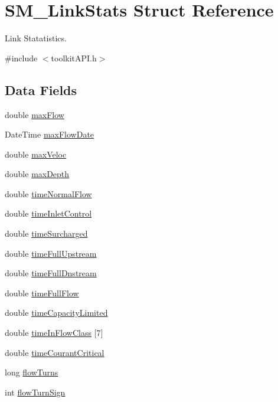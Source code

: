 \hypertarget{struct_s_m___link_stats}{}\section{S\+M\+\_\+\+Link\+Stats Struct Reference}
\label{struct_s_m___link_stats}


Link Statatistics.  




{\ttfamily \#include $<$toolkit\+A\+P\+I.\+h$>$}

\subsection*{Data Fields}
\begin{DoxyCompactItemize}
\item 
double \hyperlink{struct_s_m___link_stats_a4d84bca5454f3903c44fe865e44674f5}{max\+Flow}
\item 
Date\+Time \hyperlink{struct_s_m___link_stats_a315e22b4b57846183e5c42beb0271461}{max\+Flow\+Date}
\item 
double \hyperlink{struct_s_m___link_stats_ad51aaaeab0403dcc9204d6fc10a150ba}{max\+Veloc}
\item 
double \hyperlink{struct_s_m___link_stats_a7228dabd4235761cf24edaa63c29ac5e}{max\+Depth}
\item 
double \hyperlink{struct_s_m___link_stats_a280dc840607ae09223dc876b8c56dd3a}{time\+Normal\+Flow}
\item 
double \hyperlink{struct_s_m___link_stats_aaa492ecf4dbe89b0492681c4fedfde2b}{time\+Inlet\+Control}
\item 
double \hyperlink{struct_s_m___link_stats_ae5c6e5a148cd0c7920e6298adccd4648}{time\+Surcharged}
\item 
double \hyperlink{struct_s_m___link_stats_af117df3659482483cc3893b1ff3e36aa}{time\+Full\+Upstream}
\item 
double \hyperlink{struct_s_m___link_stats_aaaf2b8def64575cf788c672c5096efd2}{time\+Full\+Dnstream}
\item 
double \hyperlink{struct_s_m___link_stats_a6a53d5ec23e7a135687343a689ac1e8a}{time\+Full\+Flow}
\item 
double \hyperlink{struct_s_m___link_stats_a368150c8c95f54e720cac8061d7965b0}{time\+Capacity\+Limited}
\item 
double \hyperlink{struct_s_m___link_stats_a760ac35ace3da05b6fc8a4ffbf1131ad}{time\+In\+Flow\+Class} \mbox{[}7\mbox{]}
\item 
double \hyperlink{struct_s_m___link_stats_a9b8dde5a8c0d75a55f9037adef91e309}{time\+Courant\+Critical}
\item 
long \hyperlink{struct_s_m___link_stats_ada1865c586b1e17558bc5f77a182fec8}{flow\+Turns}
\item 
int \hyperlink{struct_s_m___link_stats_adcf8d5ec953a621ed93aac9c501142c2}{flow\+Turn\+Sign}
\end{DoxyCompactItemize}


